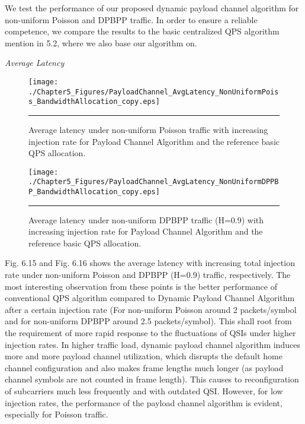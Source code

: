 We test the performance of our proposed dynamic payload channel algorithm for non-uniform Poisson and DPBPP traffic. In order to ensure a reliable competence, we compare the results to the basic centralized QPS algorithm mention in 5.2, where we also base our algorithm on. 

\textit{Average Latency}


\begin{figure}[htbp]
  \centering
    \texttt{[image: ./Chapter5\_Figures/PayloadChannel\_AvgLatency\_NonUniformPoiss\_BandwidthAllocation\_copy.eps]}
    \rule{35em}{0.5pt}
  \caption[Dynamic Payload Channel Average latency under uniform Poisson Traffic ]{Average latency under non-uniform Poisson traffic with increasing injection rate for Payload Channel Algorithm and the reference basic QPS allocation.}
  \label{fig:Electron}
\end{figure}


\begin{figure}[htbp]
  \centering
    \texttt{[image: ./Chapter5\_Figures/PayloadChannel\_AvgLatency\_NonUniformDPPBP\_BandwidthAllocation\_copy.eps]}
    \rule{35em}{0.5pt}
  \caption[Dynamic Payload Channel Average latency under non-uniform DPBPP traffic (H=0.9) ]{Average latency under non-uniform DPBPP traffic (H=0.9) with increasing injection rate for Payload Channel Algorithm and the reference basic QPS allocation.}
  \label{fig:Electron}
\end{figure}



Fig. 6.15 and Fig. 6.16 shows the average latency with increasing total injection rate under non-uniform Poisson and DPBPP (H=0.9) traffic, respectively. The most interesting observation from these points is the better performance of conventional QPS algorithm compared to Dynamic Payload Channel Algorithm after a certain injection rate (For non-uniform Poisson around 2 packets/symbol and for non-uniform DPBPP around 2.5 packets/symbol). This shall root from the requirement of more rapid response to the fluctuations of QSIs under higher injection rates. In higher traffic load, dynamic payload channel algorithm induces more and more payload channel utilization, which disrupts the default home channel configuration and also makes frame lengths much longer (as payload channel symbols are not counted in frame length). This causes to reconfiguration of subcarriers much less frequently and with outdated QSI. However, for low injection rates, the performance of the payload channel algorithm is evident, especially for Poisson traffic. 


